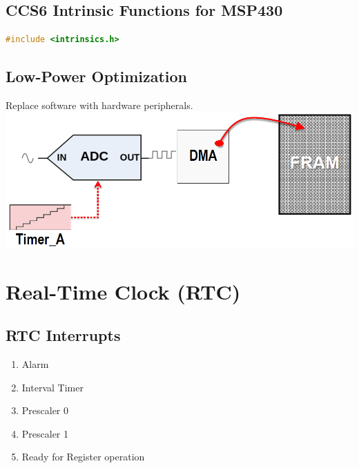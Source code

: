 \subsection{CCS6 Intrinsic Functions for MSP430}
\begin{lstlisting}[language=c]
	#include <intrinsics.h>
\end{lstlisting}

\subsection{Low-Power Optimization}
Replace software with hardware peripherals.
\includegraphics[width=0.8\columnwidth, center]{Images/LPM_replace_hw_with_sw.png}

\section{Real-Time Clock (RTC) }
\subsection{RTC Interrupts}
\begin{enumerate}
	\itemsep-.5em 
	\item Alarm
	\item Interval Timer
	\item Prescaler 0
	\item Prescaler 1
	\item Ready for Register operation
\end{enumerate}

